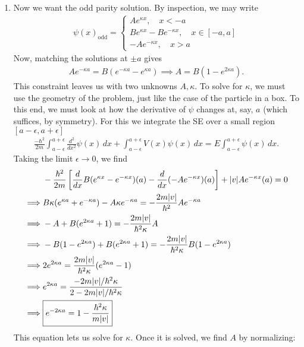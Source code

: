 \documentclass{article}
\theoremstyle{definition}
\newcommand{\f}[2]{\frac{#1}{#2}}
\newcommand{\lb}{\left[}
\newcommand{\rb}{\right]}
\begin{document}
\begin{enumerate}[label=(\alph*)]
	
	\item Now we want the odd parity solution. By inspection, we may write 
	\begin{align*}
	\boxed{\psi(x)_\text{odd} = 
		\begin{cases}
		A e^{\kappa x}, \quad x < -a\\
		B e^{\kappa x} - Be^{-\kappa x}, \quad x\in [-a,a] \\
		-A e^{-\kappa x}, \quad x > a
		\end{cases}}
	\end{align*}
	Now, matching the solutions at $\pm a$ gives
	\begin{align*}
	A e^{-\kappa a} = B(e^{-\kappa a} - e^{\kappa a}) \implies A = B(1 - e^{2\kappa a}). 
	\end{align*}
	This constraint leaves us with two unknowns $A,\kappa$. To solve for $\kappa$, we must use the geometry of the problem, just like the case of the particle in a box. To this end, we must look at how the derivative of $\psi$ changes at, say, $a$ (which suffices, by symmetry). For this we integrate the SE over a small region $[a-\epsilon, a+\epsilon]$
	\begin{align*}
	\f{-\hbar^2}{2m}\int_{a-\epsilon}^{a+\epsilon} \f{d^2}{dx^2}\psi(x)\,dx + \int_{a-\epsilon}^{a+\epsilon} V(x)\psi(x)\,dx = E \int_{a-\epsilon}^{a+\epsilon} \psi(x)\,dx.
	\end{align*}
	Taking the limit $\epsilon \to 0$, we find 
	\begin{align*}
	&-\f{\hbar^2}{2m} \lb \f{d}{dx}B(e^{\kappa x} - e^{-\kappa x})(a) - \f{d}{dx}(-Ae^{-\kappa x})(a) \rb + \abs{v} Ae^{-\kappa x}(a) = 0 \\
	\implies & B\kappa(e^{\kappa a } + e^{-\kappa a} ) - A\kappa e^{-\kappa a} = -\f{2m\abs{v} }{\hbar^2}A e^{-\kappa a} \\
	\implies &  -A+ B(e^{2\kappa a} + 1) = -\f{2m\abs{v}}{\hbar^2 \kappa} A \\ 
	\implies & -B(1 - e^{2\kappa a}) + B(e^{2\kappa a} + 1) = -\f{2m\abs{v}}{\hbar^2 \kappa} B(1 - e^{2\kappa a})\\ 
	\implies & 2e^{2\kappa a} = \f{2m\abs{v}}{\hbar^2 \kappa} (e^{2\kappa a}-1)\\
	\implies & e^{2\kappa a} = \f{-2m\abs{v}/\hbar^2 \kappa}{2-2m\abs{v}/\hbar^2\kappa} \\
	\implies & \boxed{e^{-2\kappa a} = 1-\f{\hbar^2\kappa}{m\abs{v}}}
	\end{align*}
	This equation lets us solve for $\kappa$. Once it is solved, we find $A$ by normalizing:

\end{enumerate}
\end{document}
